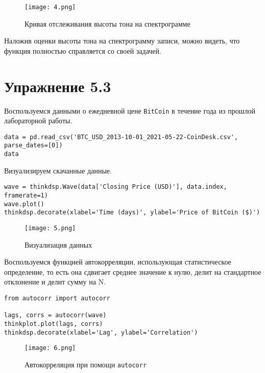 \documentclass[a4paper,12pt]{report}
\begin{document}
\begin{figure}[H]
        \centering
        \texttt{[image: 4.png]}
        \caption{Кривая отслеживания высоты тона на спектрограмме}
        \label{fig:lab5_fig2_2}
\end{figure}

Наложив оценки высоты тона на спектрограмму записи, можно видеть, что функция полностью справляется со своей задачей.

\chapter{Упражнение 5.3}

Воспользуемся данными о ежедневной цене \texttt{BitCoin} в течение года из прошлой лабораторной работы.

\begin{lstlisting}[caption=Таблица данных]
data = pd.read_csv('BTC_USD_2013-10-01_2021-05-22-CoinDesk.csv', parse_dates=[0])
data
\end{lstlisting}

Визуализируем скачанные данные.

\begin{lstlisting}[caption=Визуализация данных]
wave = thinkdsp.Wave(data['Closing Price (USD)'], data.index, framerate=1)
wave.plot()
thinkdsp.decorate(xlabel='Time (days)', ylabel='Price of BitCoin ($)')
\end{lstlisting}

\begin{figure}[H]
        \centering
        \texttt{[image: 5.png]}
        \caption{Визуализация данных}
        \label{fig:lab5_fig3_2}
\end{figure}

Воспользуемся функцией автокорреляции, использующая статистическое определение, то есть она сдвигает среднее значение к нулю, делит на стандартное отклонение и делит сумму на N.

\begin{lstlisting}[caption=Автокорреляция при помощи \texttt{autocorr}]
from autocorr import autocorr

lags, corrs = autocorr(wave)
thinkplot.plot(lags, corrs)
thinkdsp.decorate(xlabel='Lag', ylabel='Correlation')
\end{lstlisting}

\begin{figure}[H]
        \centering
        \texttt{[image: 6.png]}
        \caption{Автокорреляция при помощи \texttt{autocorr}}
        \label{fig:lab5_fig3_3}
\end{figure}
\end{document}
